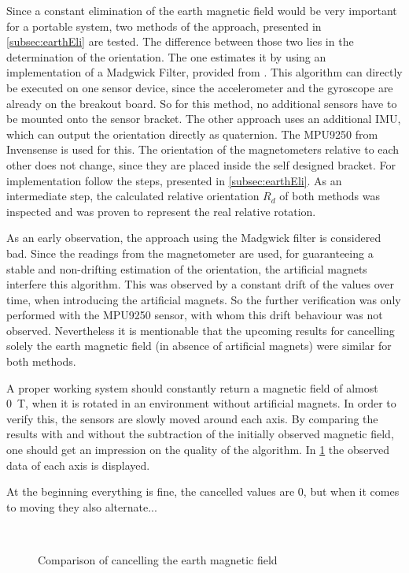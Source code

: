 Since a constant elimination of the earth magnetic field would be very important for a portable system, two methods of the approach, presented in \ref{subsec:earthEli} are tested. The difference between those two lies in the determination of the orientation. The one estimates it by using an implementation of a Madgwick Filter, provided from \cite{mikeshub2012}. This algorithm can directly be executed on one sensor device, since the accelerometer and the gyroscope are already on the breakout board. So for this method, no additional sensors have to be mounted onto the sensor bracket. The other approach uses an additional \ac{IMU}, which can output the orientation directly as quaternion. The MPU9250 from Invensense \cite{MPU2014} is used for this. The orientation of the magnetometers relative to each other does not change, since they are placed inside the self designed bracket. For implementation follow the steps, presented in \ref{subsec:earthEli}. As an intermediate step, the calculated relative orientation $ R_{d} $ of both methods was inspected and was proven to represent the real relative rotation.

As an early observation, the approach using the Madgwick filter is considered bad. Since the readings from the magnetometer are used, for guaranteeing a stable and non-drifting estimation of the orientation, the artificial magnets interfere this algorithm. This was observed by a constant drift of the values over time, when introducing the artificial magnets. So the further verification was only performed with the MPU9250 sensor, with whom this drift behaviour was not observed. Nevertheless it is mentionable that the upcoming results for cancelling solely the earth magnetic field (in absence of artificial magnets) were similar for both methods.

A proper working system should constantly return a magnetic field of almost \SI{0}{\tesla}, when it is rotated in an environment without artificial magnets. In order to verify this, the sensors are slowly moved around each axis. By comparing the results with and without the subtraction of the initially observed magnetic field, one should get an impression on the quality of the algorithm. In \ref{fig:earthCancelRes} the observed data of each axis is displayed.

At the beginning everything is fine, the cancelled values are 0, but when it comes to moving they also alternate...

\begin{figure}[h]
\centering
	\\
\caption{Comparison of cancelling the earth magnetic field}
\label{fig:earthCancelRes}
\end{figure}

